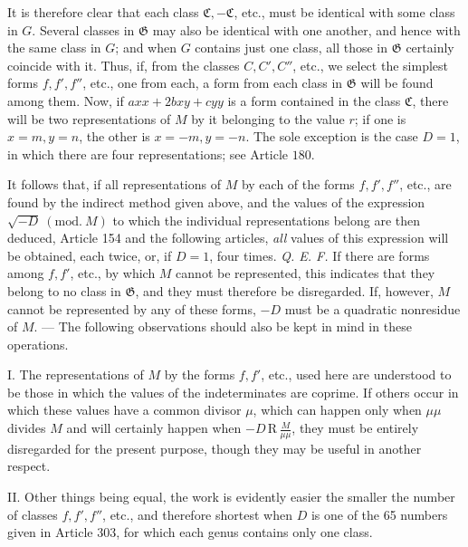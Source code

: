 It is therefore clear that each class \(\mathfrak C,\allowbreak -\mathfrak C\), etc., must be identical with some class in \(G\). Several classes in \(\mathfrak G\) may also be identical with one another, and hence with the same class in \(G\); and when \(G\) contains just one class, all those in \(\mathfrak G\) certainly coincide with it. Thus, if, from the classes \(C,\allowbreak C',\allowbreak C''\), etc., we select the simplest forms \(f,\allowbreak f',\allowbreak f''\), etc., one from each, a form from each class in \(\mathfrak G\) will be found among them. Now, if \(axx+2bxy+cyy\) is a form contained in the class \(\mathfrak C\), there will be two representations of \(M\) by it belonging to the value \(r\); if one is \(x=m,\allowbreak y=n\), the other is \(x=-m,\allowbreak y=-n\). The sole exception is the case \(D=1\), in which there are four representations; see Article \(180\).

It follows that, if all representations of \(M\) by each of the forms \(f,\allowbreak f',\allowbreak f''\), etc., are found by the indirect method given above, and
the values of the expression \(\surd{-D}\ (\mathrm{mod.}\ M)\) to which the individual representations belong are then deduced, Article 154 and the following articles, \textit{all} values of this expression will be obtained, each twice, or, if \(D=1\), four times. \textit{Q. E. F.} If there are forms among \(f,\allowbreak f'\), etc., by which \(M\) cannot be represented, this indicates that they belong to no class in \(\mathfrak G\), and they must therefore be disregarded. If, however, \(M\) cannot be represented by any of these forms, \(-D\) must be a quadratic nonresidue of \(M\). --- The following observations should also be kept in mind in these operations.

I. The representations of \(M\) by the forms \(f,\allowbreak f'\), etc., used here are understood to be those in which the values of the indeterminates are coprime. If others occur in which these values have a common divisor \(\mu\), which can happen only when \(\mu\mu\) divides \(M\) and will certainly happen when \(-D\,\mathrm R\,\frac{M}{\mu\mu}\), they must be entirely disregarded for the present purpose, though they may be useful in another respect.

II. Other things being equal, the work is evidently easier the smaller the number of classes \(f,\allowbreak f',\allowbreak f''\), etc., and therefore shortest when \(D\) is one of the 65 numbers given in Article 303, for which each genus contains only one class.

